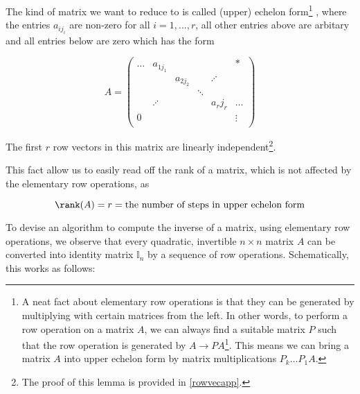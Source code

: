 \documentclass[a4paper,12pt]{report}
\begin{document}
The kind of matrix we want to reduce to is called (upper) echelon form\footnote{A neat fact about elementary row operations is that they can be generated by multiplying with certain matrices from the left. In other words, to perform a row operation on a matrix \(A\), we can always find a suitable matrix \(P\) such that the row operation is generated by \(A \rightarrow PA\)\footnote{The explicit form of the matrices are given in \cref{APA}.}. This means we can bring a matrix \(A\) into upper echelon form by matrix multiplications \(P_{k} \ldots P_{1}A \).} , where the entries \(a_{ij_{i} } \) are non-zero for all \(i = 1, ..., r\), all other entries above are arbitary and all entries below are zero which has the form

\begin{equation}
    A = \begin{pmatrix}
        \ldots & a_{1j_{1} }  &  &  &  & *  \\
         &  & a_{2j_{2} }  &  & \iddots    &   \\
         &  &  & \ddots  &  &   \\
         & \iddots &  &  & a_{r}j_{r}   & \ldots   \\
        0 &  &  &  &  & \vdots   \\
    \end{pmatrix}
\end{equation}


\begin{lemma} \label{rowvec} 
The first \(r\) row vectors in this matrix are linearly independent\footnote{The proof of this lemma is provided in \cref{rowvecapp}.}. 
\end{lemma}



This fact allow us to easily read off the rank of a matrix, which is not affected by the elementary row operations, as

\begin{equation}
    \rank (A) = r = \text{the number of steps in upper echelon form}
\end{equation}

To devise an algorithm to compute the inverse of a matrix, using elementary row operations, we observe that every quadratic, invertible \(n \times n\) matrix \(A\) can be converted into identity matrix \(\mathbb{I}_{n} \) by a sequence of row operations. Schematically, this works as follows:
\end{document}
